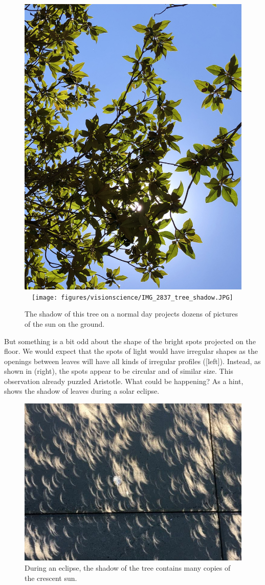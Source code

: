 \begin{figure}[h!]
    \centerline{
        \includegraphics[width=.497\linewidth]{figures/visionscience/IMG_2842_tree_pinholes.jpg} %
        ~~\texttt{[image: figures/visionscience/IMG\_2837\_tree\_shadow.JPG]} %
    }
    \caption{The shadow of this tree on a normal day projects dozens of pictures of the sun on the ground.}
    \label{fig:tree_pinholes}
\end{figure}

But something is a bit odd about the shape of the bright spots projected on the floor. We would expect that the spots of light would have irregular shapes as the openings between leaves will have all kinds of irregular profiles (\fig{\ref{fig:tree_pinholes}}[left]). Instead, as shown in \fig{\ref{fig:tree_pinholes}}(right), the spots appear to be circular and of similar size. This observation already puzzled Aristotle. What could be happening?  As a hint, \fig{\ref{fig:tree_shadow_eclipse}} shows the shadow of leaves during a solar eclipse.


\begin{figure}[h!]
    \centerline{
        \includegraphics[width=.9\linewidth]{figures/visionscience/tree_shadow_eclipse2.jpg} %
    }
    \caption{During an eclipse, the shadow of the tree contains many copies of the crescent sun.}
    \label{fig:tree_shadow_eclipse}
\end{figure}


